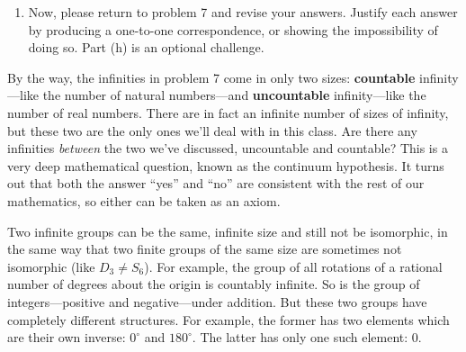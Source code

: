 \documentclass[../gatm.tex]{subfiles}
\begin{document}
\begin{enumerate}
\setcounter{enumi}{\value{inf_problem_i}}
\item Now, please return to problem 7 and revise your answers. Justify each answer by producing a one-to-one correspondence, or showing the impossibility of doing so. Part (h) is an optional challenge.
\setcounter{inf_problem_i}{\value{enumi}}
\end{enumerate}

By the way, the infinities in problem 7 come in only two sizes: \textbf{countable} infinity---like the number of natural numbers---and \textbf{uncountable} infinity---like the number of real numbers. There are in fact an infinite number of sizes of infinity, but these two are the only ones we'll deal with in this class. Are there any infinities \textit{between} the two we’ve discussed, uncountable and countable? This is a very deep mathematical question, known as the continuum hypothesis. It turns out that both the answer ``yes'' and ``no'' are consistent with the rest of our mathematics, so either can be taken as an axiom.

Two infinite groups can be the same, infinite size and still not be isomorphic, in the same way that two finite groups of the same size are sometimes not isomorphic (like $D_3\neq S_6$). For example, the group of all rotations of a rational number of degrees about the origin is countably infinite. So is the group of integers---positive and negative---under addition. But these two groups have completely different structures. For example, the former has two elements which are their own inverse: $0^\circ$ and $180^\circ$. The latter has only one such element: $0$.
\end{document}
